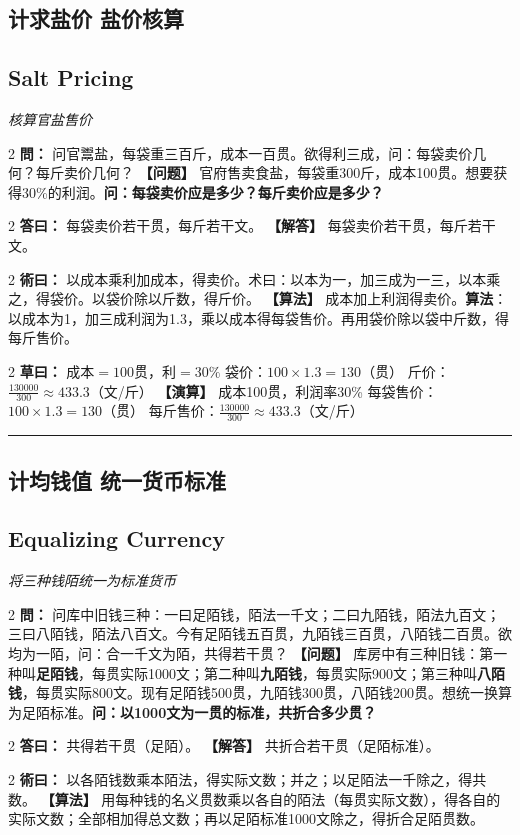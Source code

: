 \documentclass[11pt,a4paper]{article}
\newcommand{\longline}{\noindent\rule{\textwidth}{0.4pt}}
\newcommand{\bilingualProblem}[2]{%
  \vspace{0.6em}%
  \begin{paracol}{2}%
  \noindent\textcolor{problemcolor}{\textbf{問：}}#1%
  \switchcolumn%
  \noindent\textcolor{problemcolor}{\textbf{【问题】}}#2%
  \end{paracol}%
  \vspace{0.3em}%
}
\newcommand{\bilingualAnswer}[2]{%
  \begin{paracol}{2}%
  \noindent\textcolor{answercolor}{\textbf{答曰：}}#1%
  \switchcolumn%
  \noindent\textcolor{answercolor}{\textbf{【解答】}}#2%
  \end{paracol}%
  \vspace{0.3em}%
}
\newcommand{\bilingualMethod}[2]{%
  \begin{paracol}{2}%
  \noindent\textcolor{methodcolor}{\textbf{術曰：}}#1%
  \switchcolumn%
  \noindent\textcolor{methodcolor}{\textbf{【算法】}}#2%
  \end{paracol}%
  \vspace{0.3em}%
}
\newcommand{\bilingualWorking}[2]{%
  \begin{paracol}{2}%
  \noindent\textcolor{workingcolor}{\textbf{草曰：}}#1%
  \switchcolumn%
  \noindent\textcolor{workingcolor}{\textbf{【演算】}}#2%
  \end{paracol}%
  \vspace{0.3em}%
}
\newcommand{\bilingualSubsection}[2]{%
  \subsection{#1}
  \begin{center}
  {\small\color{sectioncolor}\textit{#2}}
  \end{center}
  \vspace{0.3em}
}
\begin{document}
\medskip

\subsection{计求盐价 \quad 盐价核算}
\bilingualSubsection{Salt Pricing}{核算官盐售价}

\bilingualProblem{%
问官鬻盐，每袋重三百斤，成本一百贯。欲得利三成，问：每袋卖价几何？每斤卖价几何？%
}{%
官府售卖食盐，每袋重300斤，成本100贯。想要获得30\%的利润。\textbf{问：每袋卖价应是多少？每斤卖价应是多少？}%
}

\bilingualAnswer{%
每袋卖价若干贯，每斤若干文。%
}{%
每袋卖价若干贯，每斤若干文。%
}

\bilingualMethod{%
以成本乘利加成本，得卖价。术曰：以本为一，加三成为一三，以本乘之，得袋价。以袋价除以斤数，得斤价。%
}{%
成本加上利润得卖价。\textbf{算法}：以成本为1，加三成利润为1.3，乘以成本得每袋售价。再用袋价除以袋中斤数，得每斤售价。%
}

\bilingualWorking{%
成本$=100$贯，利$=30\%$
袋价：$100 \times 1.3 = 130$（贯）
斤价：$\displaystyle\frac{130000}{300} \approx 433.3$（文/斤）%
}{%
成本100贯，利润率30\%
每袋售价：$100 \times 1.3 = 130$（贯）
每斤售价：$\displaystyle\frac{130000}{300} \approx 433.3$（文/斤）%
}

\vspace{0.5em}
\longline

\subsection{计均钱值 \quad 统一货币标准}
\bilingualSubsection{Equalizing Currency}{将三种钱陌统一为标准货币}

\bilingualProblem{%
问库中旧钱三种：一曰足陌钱，陌法一千文；二曰九陌钱，陌法九百文；三曰八陌钱，陌法八百文。今有足陌钱五百贯，九陌钱三百贯，八陌钱二百贯。欲均为一陌，问：合一千文为陌，共得若干贯？%
}{%
库房中有三种旧钱：第一种叫\textbf{足陌钱}，每贯实际1000文；第二种叫\textbf{九陌钱}，每贯实际900文；第三种叫\textbf{八陌钱}，每贯实际800文。现有足陌钱500贯，九陌钱300贯，八陌钱200贯。想统一换算为足陌标准。\textbf{问：以1000文为一贯的标准，共折合多少贯？}%
}

\bilingualAnswer{%
共得若干贯（足陌）。%
}{%
共折合若干贯（足陌标准）。%
}

\bilingualMethod{%
以各陌钱数乘本陌法，得实际文数；并之；以足陌法一千除之，得共数。%
}{%
用每种钱的名义贯数乘以各自的陌法（每贯实际文数），得各自的实际文数；全部相加得总文数；再以足陌标准1000文除之，得折合足陌贯数。%
}
\end{document}
